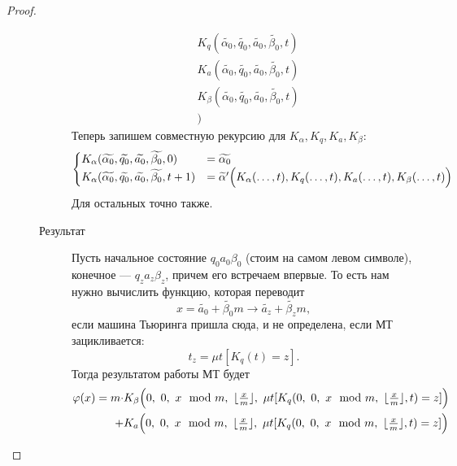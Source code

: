 \begin{proof}
\begin{description}
\begin{description}
\[\begin{aligned}
			 &K_{ q }(\widetilde{ \alpha_0} , \widetilde{ q_0} , \widetilde{ a_0}, \widetilde{ \beta_0}, t) \\ 
			 &K_{ a }(\widetilde{ \alpha_0} , \widetilde{ q_0} , \widetilde{ a_0}, \widetilde{ \beta_0}, t) \\ 
			 &K_{ \beta  }(\widetilde{ \alpha_0} , \widetilde{ q_0} , \widetilde{ a_0}, \widetilde{ \beta_0}, t) \\ 
			 &)
	\end{aligned}
	\]
	Теперь запишем совместную рекурсию для $ K_{ \alpha }, K_{ q}, K_{a}, K_{ \beta }$:
	\[
	\begin{aligned}
		\begin{cases}
			K_{ \alpha }(\widetilde{ \alpha _0} , \widetilde{ q_0} , \widetilde{ a_0} , \widetilde{ \beta _0} , 0) &= \widetilde{ \alpha _0} \\
			K_{ \alpha }(\widetilde{ \alpha _0} , \widetilde{ q_0} , \widetilde{ a_0} , \widetilde{ \beta _0} , t+1) &= \widetilde{ \alpha } ' \Bigl(  
				K_{ \alpha }( \ldots , t), K_{q} (\ldots , t), K_{a} (\ldots , t) , K_{ \beta }(\ldots , t)
			\Bigr)
		\end{cases}
	\end{aligned}
	\]
	Для остальных точно также.

\item[Результат] 
	Пусть начальное состояние $ q_0 a_0 \beta_0$ (стоим на самом левом символе), конечное  --- $ q_{z} a_{z} \beta _{z}$, причем его встречаем впервые. 
	То есть нам нужно вычислить функцию, которая переводит 
	$$ x = \widetilde{ a_0} + \widetilde{ \beta_0} m \longrightarrow \widetilde{a_z} + \widetilde{\beta _z} m,$$
	если машина Тьюринга пришла сюда, и не определена, если МТ зацикливается:
	\[
		t_z = \mu t[K_{q}(t) = z]
	.\] 
	Тогда результатом работы МТ будет
	\[
	\begin{aligned}
		\varphi (x) = m \cdot  &K _{\beta} \Bigl(0, ~0, ~x \mod m, ~\lfloor \tfrac{x}{m} \rfloor, ~\mu t[K_{q}(0, ~0, ~x \mod m, ~\lfloor \tfrac{x}{m} \rfloor, t) = z]\Bigr)\\
		+ &K_{a}\Bigl(0, ~0, ~x \mod m, ~\lfloor \tfrac{x}{m} \rfloor, ~\mu t[K_{q}(0, ~0, ~x \mod m, ~\lfloor \tfrac{x}{m} \rfloor, t) = z ]\Bigr)
	\end{aligned}
	\]
			\end{description}
    \end{description} 
\end{proof}


